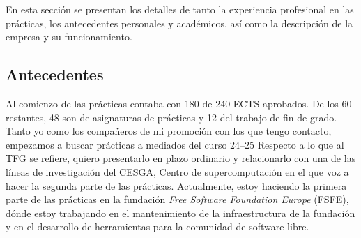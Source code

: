 %
%
%
%
%
%
%
%
%


En esta sección se presentan los detalles de tanto la experiencia profesional en las prácticas,
los antecedentes personales y académicos, así como la descripción de la empresa y su funcionamiento.

\subsection{Antecedentes}\label{subsec:practicas-antecedentes}
    Al comienzo de las prácticas contaba con 180 de 240 ECTS aprobados.
    De los 60 restantes, 48 son de asignaturas de prácticas y 12 del trabajo de fin de grado.
    Tanto yo como los compañeros de mi promoción con los que tengo contacto, empezamos a buscar prácticas a mediados del curso 24--25
    Respecto a lo que al TFG se refiere, quiero presentarlo en plazo ordinario y relacionarlo con una de las líneas de investigación
    del CESGA, Centro de supercomputación en el que voz a hacer la segunda parte de las prácticas.
    Actualmente, estoy haciendo la primera parte de las prácticas en la fundación \textit{Free Software Foundation Europe} (FSFE),
    dónde estoy trabajando en el mantenimiento de la infraestructura de la fundación y en el desarrollo de herramientas para la comunidad de software libre.

